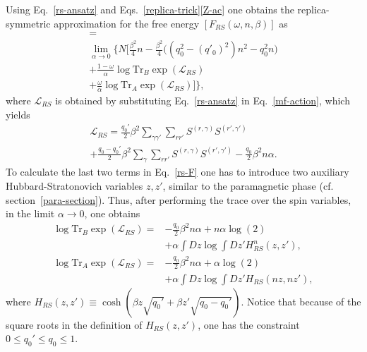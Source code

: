 \documentclass[twocolumn,superscriptaddress,prb,10pt]{revtex4-1}
\def\tr{\textrm{Tr}}
\begin{document}
Using Eq.~\eqref{rs-ansatz} and Eqs.~\eqref{replica-trick}\eqref{Z-ac} one obtains 
the replica-symmetric approximation for the free energy $[F_{RS}(\omega,n,\beta)]$ 
as 
%
\begin{multline}
[F_{RS}(\omega,n,\beta)]=\\\lim_{\alpha\to 0}\Big\{
N\Big[\frac{\beta^2}{4}n-\frac{\beta^2}{4}\Big(
(q_0^2-(q'_0)^2)n^2-q_0^2n\Big)\\
+\frac{1-\omega}{\alpha}\log\tr_B\exp({\mathcal L}_{RS})\\
+\frac{\omega}{\alpha}\log\tr_A \exp({\mathcal L}_{RS})
\Big]\Big\},
\label{rs-F}
\end{multline}
%
where ${\mathcal L}_{RS}$ is obtained by substituting Eq.~\eqref{rs-ansatz} 
in Eq.~\eqref{mf-action}, which yields 
%
\begin{multline}
\label{l-rs}
{\mathcal L}_{RS}=\frac{q_0'}{2}\beta^2
\sum\limits_{\gamma\gamma'}\sum_{rr'}
S^{(r,\gamma)}S^{(r',\gamma')}\\
+\frac{q_0-q_0'}{2}\beta^2\sum_\gamma\sum_{rr'}
S^{(r,\gamma)}S^{(r',\gamma')}-\frac{q_0}{2}\beta^2n\alpha.
\end{multline}
%
To calculate the last two terms in Eq.~\eqref{rs-F} one has to introduce 
two auxiliary Hubbard-Stratonovich variables $z,z'$, similar to the 
paramagnetic phase (cf. section~\ref{para-section}). Thus, after performing 
the trace over the spin variables, in the limit $\alpha\to0$, one obtains 
%
\begin{align}
\label{eq1}
 \log\tr_B\exp({\mathcal L}_{RS})=&
-\frac{q_0}{2}\beta^2 n\alpha+n\alpha\log(2)\\\nonumber
&+\alpha\int Dz
\log\int Dz'H_{RS}^n(z,z'),\\
\label{eq2}
 \log\tr_A\exp({\mathcal L}_{RS})=&
-\frac{q_0}{2}\beta^2 n\alpha+\alpha\log(2)\\\nonumber
&+\alpha\int Dz
\log\int Dz'H_{RS}(nz,nz'), 
\end{align}
%
where $H_{RS}(z,z')\equiv\cosh(\beta z\sqrt{q_0'}+\beta z'\sqrt{q_0-q_0'})$. 
Notice that because of the square roots in the definition of $H_{RS}(z,z')$, 
one has the constraint $0\le q_0'\le q_0\le 1$. 
\end{document}
